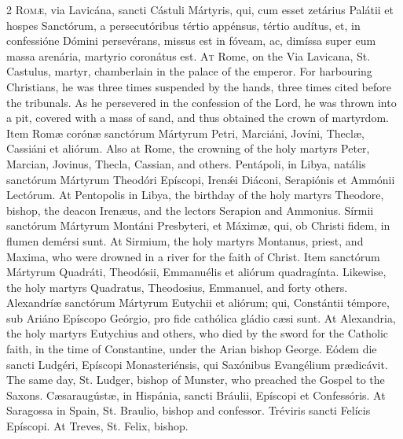 \begin{paracol}{2}
\lettrine[lines=2]{R}{omæ,} via Lavicána, sancti Cástuli Mártyris, 
 qui, cum esset zetárius Palátii et hospes Sanctórum, a persecutóribus tértio 
 appénsus, tértio audítus, et, in confessióne Dómini persevérans, missus est 
 in fóveam, ac, dimíssa super eum massa arenária, martyrio coronátus est.
\switchcolumn
{}
\lettrine[lines=2]{A}{t} Rome, on the Via Lavicana, St. Castulus, martyr, chamberlain in the 
 palace of the emperor. For harbouring Christians, he was three times 
 suspended by the hands, three times cited before the tribunals. As he 
 persevered in the confession of the Lord, he was thrown into a pit, covered 
 with a mass of sand, and thus obtained the crown of martyrdom.
\switchcolumn*
{}
Item Romæ corónæ sanctórum Mártyrum Petri, 
 Marciáni, Jovíni, Theclæ, Cassiáni et aliórum.
\switchcolumn
{}
Also at Rome, the crowning of the holy martyrs Peter, Marcian, Jovinus, 
 Thecla, Cassian, and others.
\switchcolumn*
{}
Pentápoli, in Libya, natális sanctórum 
 Mártyrum Theodóri Epíscopi, Irenǽi Diáconi, 
 Serapiónis et Ammónii Lectórum.
\switchcolumn
{}
At Pentopolis in Libya, the birthday of the holy martyrs Theodore, bishop, 
 the deacon Irenæus, and the lectors Serapion and Ammonius.
\switchcolumn*
{}
Sírmii sanctórum Mártyrum Montáni Presbyteri, et Máximæ, 
 qui, ob Christi fidem, in flumen demérsi sunt.
\switchcolumn
{}
At Sirmium, the holy martyrs Montanus, priest, and Maxima, who were drowned 
 in a river for the faith of Christ.
\switchcolumn*
{}
Item sanctórum Mártyrum Quadráti, Theodósii, Emmanuélis et aliórum 
 quadragínta.
\switchcolumn
{}
Likewise, the holy martyrs Quadratus, Theodosius, Emmanuel, and forty 
 others.
\switchcolumn*
{}
Alexandríæ sanctórum Mártyrum Eutychii et 
 aliórum; qui, Constántii témpore, sub Ariáno Epíscopo Geórgio, pro fide 
 cathólica gládio cæsi sunt.
\switchcolumn
{}
At Alexandria, the holy martyrs Eutychius and others, who died by the sword 
 for the Catholic faith, in the time of Constantine, under the Arian bishop 
 George.
\switchcolumn*
{}
Eódem die sancti Ludgéri, Epíscopi Monasteriénsis, qui Saxónibus Evangélium 
 prædicávit.
\switchcolumn
{}
The same day, St. Ludger, bishop of Munster, who preached the Gospel to the 
 Saxons.
\switchcolumn*
{}
Cæsaraugústæ, in Hispánia, sancti Bráulii, 
 Epíscopi et Confessóris.
\switchcolumn
{}
At Saragossa in Spain, St. Braulio, bishop and confessor.
\switchcolumn*
{}
Tréviris sancti Felícis Epíscopi.
\switchcolumn
{}
At Treves, St. Felix, bishop.
\switchcolumn*
{}
\end{paracol}


